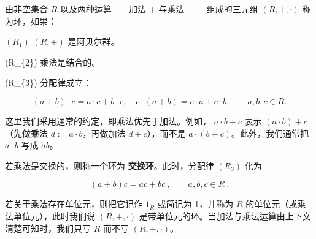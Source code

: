 由非空集合  $ R $ 以及两种运算——加法 + 与乘法  $ \cdot $——组成的三元组  $ (R, +, \cdot) $ 称为环，如果：

$ (R_{1}) $  $ (R,+) $ 是阿贝尔群。

(R\_\{2\}) 乘法是结合的。

(R\_\{3\}) 分配律成立：

\[
(a+b)\cdot c=a\cdot c+b\cdot c,\quad c\cdot(a+b)=c\cdot a+c\cdot b,\qquad a,b,c\in R.
\]

这里我们采用通常的约定，即乘法优先于加法。例如， $ a \cdot b + c $ 表示  $ (a \cdot b) + c $（先做乘法  $ d := a \cdot b $，再做加法  $ d + c $），而不是  $ a \cdot (b + c) $。此外，我们通常把  $ a \cdot b $ 写成  $ ab $。

若乘法是交换的，则称一个环为 \textbf{交换环}。此时，分配律  $ (R_{3}) $ 化为

\begin{equation}
(a+b)c=ac+bc~,\qquad a,b,c\in R~.
\end{equation}

若关于乘法存在单位元，则把它记作  $ 1_R $ 或简记为 1，并称为  $ R $ 的单位元（或乘法单位元），此时我们说  $ (R, +, \cdot) $ 是带单位元的环。当加法与乘法运算由上下文清楚可知时，我们只写  $ R $ 而不写  $ (R, +, \cdot) $。

